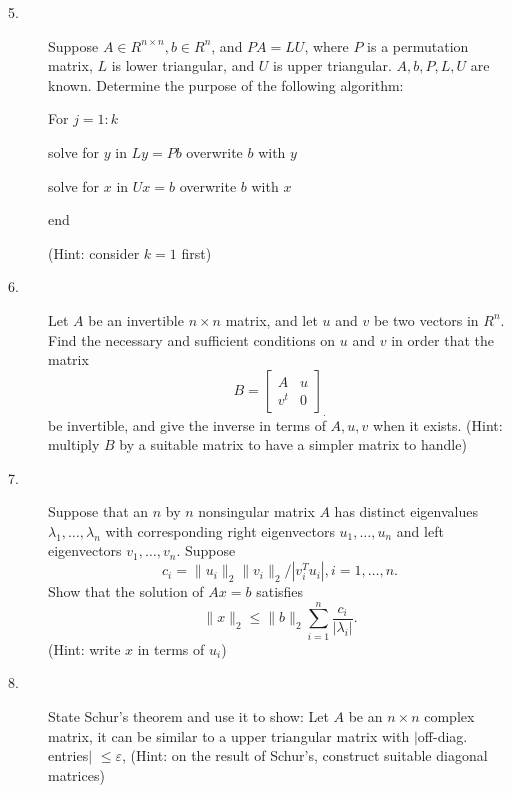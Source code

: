 \documentclass{article}
\begin{document}
\begin{description}
\item[5.]
Suppose $A \in R^{n \times n}, b \in R^n$, and $P A = LU$, where $P$ is a
permutation matrix, $L$ is lower triangular, and $U$ is upper triangular.
$A,b,P,L,U$ are known. Determine the purpose of the following algorithm:

For $j=1:k$

\quad solve for $y$ in $Ly = Pb$ \quad overwrite $b$ with $y$

\quad solve for $x$ in $Ux = b$ \quad overwrite $b$ with $x$

end

(Hint: consider $k=1$ first)

\item[6.]
Let $A$ be an invertible $n \times n$ matrix, and let $u$ and $v$ be two
vectors in $R^n$. Find the necessary and sufficient conditions on $u$
and $v$ in order that the matrix
$$B= \left[ \begin{array}{cc} A&u \\ v^t&0 \end{array} \right]_.$$
be invertible, and give the inverse in terms of $A, u,v$ when it exists.
(Hint: multiply $B$ by a suitable matrix to have a simpler matrix to handle)

\item[7.]
Suppose that an $n$ by $n$ nonsingular matrix $A$ has distinct eigenvalues
$\lambda_1, \dots, \lambda_n$ with corresponding right eigenvectors
$u_1, \dots, u_n$ and left eigenvectors $v_1, \dots, v_n$. Suppose
$$c_i = \parallel u_i \parallel_2 \parallel v_i \parallel _2 / |v_i^T u_i|,
  i=1, \dots, n.$$
Show that the solution of $Ax=b$ satisfies
$$\parallel x \parallel_2 \leq \parallel b \parallel_2 \sum^n_{i=1}
  \frac{c_i}{|\lambda_i|}.$$
(Hint: write $x$ in terms of $u_i$)

\item[8.]State Schur's theorem and use it to show: Let $A$ be an $n \times n$
complex matrix, it can be similar to a upper triangular matrix with $|$off-diag.
entries$|$ $\leq \varepsilon$, (Hint: on the result of Schur's, construct
suitable diagonal matrices)







\end{description}    
\end{document}
